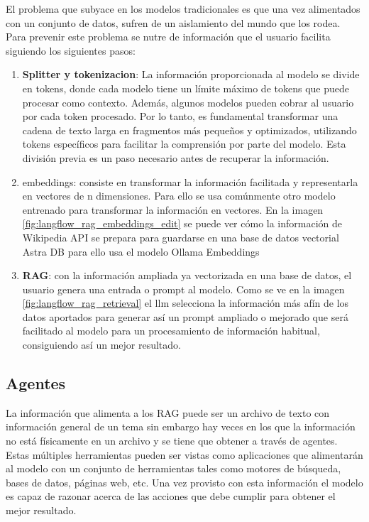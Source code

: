 	El problema que subyace en los modelos tradicionales es que una vez alimentados con un conjunto de datos, sufren de un aislamiento del mundo que los rodea. Para prevenir este problema se nutre de información que el usuario facilita siguiendo los siguientes pasos:
	\begin{enumerate}
		\item \textbf{Splitter y \gls{tokenizacion}}: La información proporcionada al modelo se divide en tokens, donde cada modelo tiene un límite máximo de tokens que puede procesar como contexto. Además, algunos modelos pueden cobrar al usuario por cada token procesado. Por lo tanto, es fundamental transformar una cadena de texto larga en fragmentos más pequeños y optimizados, utilizando tokens específicos para facilitar la comprensión por parte del modelo. Esta división previa es un paso necesario antes de recuperar la información.
	
		\item \gls{embeddings}: consiste en transformar la información facilitada y representarla en vectores de n dimensiones. Para ello se usa comúnmente otro modelo entrenado para transformar la información en vectores.
		En la imagen \ref{fig:langflow_rag_embeddings_edit} se puede ver cómo la información de Wikipedia API \cite{wikimedia_api} se prepara para guardarse en una base de datos vectorial Astra DB \cite{datastax_astra} para ello usa el modelo Ollama Embeddings
		
		
		\item \textbf{RAG}: con la información ampliada ya vectorizada en una base de datos, el usuario genera una entrada o prompt al modelo. Como se ve en la imagen \ref{fig:langflow_rag_retrieval} el \acrshort{llm}  selecciona la información más afín de los datos aportados para generar así un prompt ampliado o mejorado que será facilitado al modelo para un procesamiento de información habitual, consiguiendo así un mejor resultado.
		
	\end{enumerate}
		
	\subsection{Agentes}
	\label{sec:agentes}
	La información que alimenta a los RAG puede ser un archivo de texto con información general de un tema sin embargo hay veces en los que la información no está físicamente en un archivo y se tiene que obtener a través de \gls{agentes}.
	Estas múltiples herramientas pueden ser vistas como aplicaciones que alimentarán al modelo con un conjunto de herramientas tales como motores de búsqueda, bases de datos, páginas web, etc. Una vez provisto con esta información el modelo es capaz de razonar acerca de las acciones que debe cumplir para obtener el mejor resultado.


